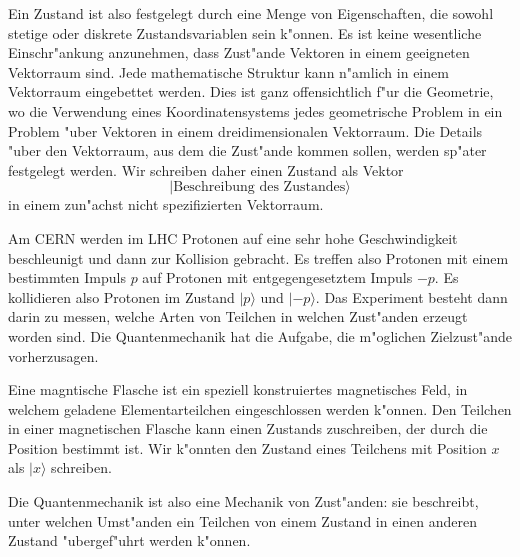 Ein Zustand ist also festgelegt durch eine Menge von Eigenschaften,
die sowohl stetige oder diskrete Zustandsvariablen sein k"onnen.
Es ist keine wesentliche Einschr"ankung anzunehmen, dass Zust"ande
Vektoren in einem geeigneten Vektorraum sind.
Jede mathematische Struktur kann n"amlich in einem Vektorraum eingebettet
werden. Dies ist ganz offensichtlich f"ur die Geometrie, wo die Verwendung
eines Koordinatensystems jedes geometrische Problem in ein Problem "uber
Vektoren in einem dreidimensionalen Vektorraum. Die Details "uber den
Vektorraum, aus dem die Zust"ande kommen sollen, werden sp"ater festgelegt
werden. Wir schreiben daher einen Zustand als Vektor
\[
|\text{Beschreibung des Zustandes}\rangle
\]
in einem zun"achst nicht spezifizierten Vektorraum.

Am CERN werden im LHC Protonen auf eine sehr hohe Geschwindigkeit 
beschleunigt und dann zur Kollision gebracht. Es treffen also
Protonen mit einem bestimmten Impuls $p$ auf Protonen mit entgegengesetztem
Impuls $-p$. Es kollidieren also Protonen im Zustand $|p\rangle$ und
$|-p\rangle$. Das Experiment besteht dann darin zu messen, welche Arten von
Teilchen in welchen Zust"anden erzeugt worden sind.
Die Quantenmechanik hat
die Aufgabe, die m"oglichen Zielzust"ande vorherzusagen.

Eine magntische Flasche ist ein speziell konstruiertes magnetisches Feld,
in welchem geladene Elementarteilchen eingeschlossen werden k"onnen.
Den Teilchen in einer magnetischen Flasche kann einen Zustands zuschreiben,
der durch die Position bestimmt ist.
Wir k"onnten den Zustand eines Teilchens mit Position $x$ als $|x\rangle$
schreiben.

Die Quantenmechanik ist also eine Mechanik von Zust"anden: sie beschreibt,
unter welchen Umst"anden ein Teilchen von einem Zustand in einen anderen
Zustand "ubergef"uhrt werden k"onnen. 


